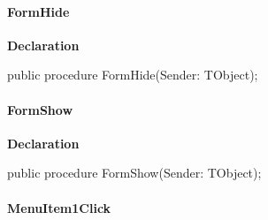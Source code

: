 \documentclass{report}
\newif\ifpdf
\begin{document}
\paragraph*{FormHide}\hspace*{\fill}

\label{mnupdate.TUMnForm-FormHide}
\begin{list}{}{
\setlength{\itemindent}{0cm}
\setlength{\listparindent}{0cm}
\setlength{\leftmargin}{\evensidemargin}
\addtolength{\leftmargin}{\tmplength}
\settowidth{\labelsep}{X}
\addtolength{\leftmargin}{\labelsep}
\setlength{\labelwidth}{\tmplength}
}
\item[\textbf{Declaration}\hfill]
\ifpdf
\begin{flushleft}
\fi
\begin{ttfamily}
public procedure FormHide(Sender: TObject);\end{ttfamily}

\ifpdf
\end{flushleft}
\fi

\end{list}
\paragraph*{FormShow}\hspace*{\fill}

\label{mnupdate.TUMnForm-FormShow}
\begin{list}{}{
\setlength{\itemindent}{0cm}
\setlength{\listparindent}{0cm}
\setlength{\leftmargin}{\evensidemargin}
\addtolength{\leftmargin}{\tmplength}
\settowidth{\labelsep}{X}
\addtolength{\leftmargin}{\labelsep}
\setlength{\labelwidth}{\tmplength}
}
\item[\textbf{Declaration}\hfill]
\ifpdf
\begin{flushleft}
\fi
\begin{ttfamily}
public procedure FormShow(Sender: TObject);\end{ttfamily}

\ifpdf
\end{flushleft}
\fi

\end{list}
\paragraph*{MenuItem1Click}\hspace*{\fill}
\end{document}
